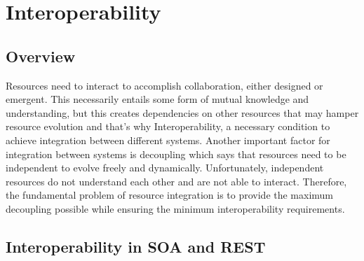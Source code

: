 

\chapter{Interoperability}
\label{chapter:interoperability}
\section{Overview}
\label{section:overview}
Resources need to interact to accomplish collaboration, either designed or emergent. This necessarily entails some form of mutual knowledge and understanding, but this creates dependencies on other resources that may hamper resource evolution and that's why Interoperability, a necessary condition to achieve integration between different systems. Another important factor for integration between systems is decoupling which says that resources need to be independent to evolve freely and dynamically. Unfortunately, independent resources do not understand each other and are not able to interact. Therefore, the fundamental problem of resource integration is to provide the maximum decoupling possible while ensuring the minimum interoperability requirements.

\section{Interoperability in SOA and REST}
\label{section:InteroperabilitySOAREST}

